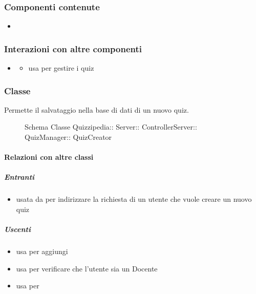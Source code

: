 \subsubsection{Componenti contenute}
\begin{itemize}
\item {}
\end{itemize}
\subsubsection{Interazioni con altre componenti}
\begin{itemize}
\item {}
\begin{itemize}
\item usa  per gestire i quiz
\end{itemize}
\end{itemize}
\subsubsection{Classe }
Permette il salvataggio nella base di dati di un nuovo quiz.
\begin{figure}[H]
\centering
\noindent{}
\caption[Schema Classe QuizCreator]{Schema Classe Quizzipedia:: Server:: ControllerServer:: QuizManager:: QuizCreator}
\end{figure}
\paragraph{Relazioni con altre classi}
\subparagraph{Entranti}
\begin{itemize}
\item usata da  per indirizzare la richiesta di un utente che vuole creare un nuovo quiz
\end{itemize}
\subparagraph{Uscenti}
\begin{itemize}
\item usa  per aggiungi
\item usa  per verificare che l'utente sia un Docente
\item usa  per 
\end{itemize}
